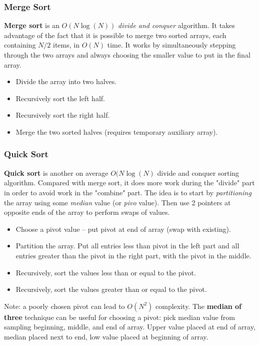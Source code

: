\subsubsection{Merge Sort}

\textbf{Merge sort} is an $O(N \log(N))$ \textit{divide and conquer} algorithm. It takes advantage of the fact that it is possible to merge two sorted arrays, each containing $N/2$ items, in $O(N)$ time. It works by simultaneously stepping through the two arrays and always choosing the smaller value to put in the final array. 

\begin{itemize}
	\item Divide the array into two halves.
	\item Recursively sort the left half. 
	\item Recursively sort the right half. 
	\item Merge the two sorted halves (requires temporary auxiliary array). 
\end{itemize}

\subsubsection{Quick Sort}

\textbf{Quick sort} is another on average $O(N \log(N)$ divide and conquer sorting algorithm. Compared with merge sort, it does more work during the "divide" part in order to avoid work in the "combine" part. The idea is to start by \textit{partitioning} the array using some \textit{median} value (or \textit{pivo} value). Then use 2 pointers at opposite ends of the array to perform swaps of values. 

\begin{itemize}
	\item Choose a pivot value -- put pivot at end of array (swap with existing).
	\item Partition the array. Put all entries less than pivot in the left part and all entries greater than the pivot in the right part, with the pivot in the middle. 
	\item Recursively, sort the values less than or equal to the pivot. 
	\item Recursively, sort the values greater than or equal to the pivot. 
\end{itemize}

Note: a poorly chosen pivot can lead to $O(N^{2})$ complexity. The \textbf{median of three} technique can be useful for choosing a pivot: pick median value from sampling beginning, middle, and end of array. Upper value placed at end of array, median placed next to end, low value placed at beginning of array. 

